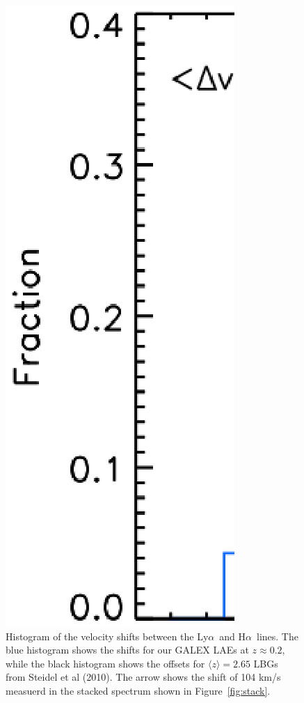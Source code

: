 \documentclass[manuscript]{emulateapj}
\newcommand{\lya}{Ly$\alpha$}
\newcommand{\ha}{H$\alpha$}
\begin{document}
\begin{figure}[h!]
   \centering
   \includegraphics[scale=.44]{delta_v.ps}
   \caption{Histogram of the velocity shifts between the 
\lya\ and \ha\ lines. The blue histogram shows the shifts for our GALEX LAEs
	 at $z\approx 0.2$, while the black histogram shows the offsets for 
	 $\langle z \rangle=2.65$ LBGs from Steidel et al (2010). The arrow shows 
	 the shift of 104 km/s measuerd in the stacked spectrum shown in 
	 Figure~\ref{fig:stack}.}
   \label{fig:histvel}
\end{figure}
\end{document}
